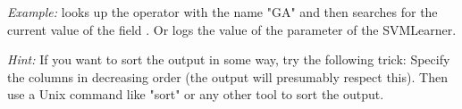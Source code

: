 {\em Example:}
 looks up the operator with the
name "GA" and then searches for the current value of the field
. Or  logs
the value of the parameter  of the SVMLearner.

{\em Hint:} 
If you want to sort the output in some way, try the following trick:
Specify the columns in decreasing order (the output will presumably
respect this). Then use a Unix command like "sort" or any other tool
to sort the output.




